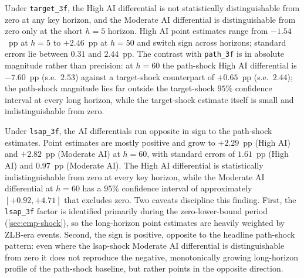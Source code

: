 \begin{table}[htbp]
\centering\small
\caption[Alternative shocks: key-horizon estimates]{Alternative shocks:
key-horizon estimates}
\label{tab:alt_shocks_key}

\end{table}

Under \texttt{target\_3f}, the High AI differential is not
statistically distinguishable from zero at any key horizon, and the
Moderate AI differential is distinguishable from zero only at the
short $h = 5$ horizon. High AI point estimates
range from $-1.54$~pp at $h = 5$ to $+2.46$~pp at $h = 50$ and switch
sign across horizons; standard errors lie between $0.31$ and
$2.44$~pp. The contrast with \texttt{path\_3f} is in absolute
magnitude rather than precision: at $h = 60$ the path-shock High AI
differential is $-7.60$~pp (s.e.~$2.53$) against a target-shock
counterpart of $+0.65$~pp (s.e.~$2.44$); the path-shock magnitude lies
far outside the target-shock $95\%$ confidence interval at every long
horizon, while the target-shock estimate itself is small and
indistinguishable from zero.

Under \texttt{lsap\_3f}, the AI differentials run opposite in sign
to the path-shock estimates. Point estimates are mostly positive
and grow to $+2.29$~pp (High AI) and $+2.82$~pp (Moderate AI) at
$h = 60$, with standard errors of $1.61$~pp (High AI) and
$0.97$~pp (Moderate AI). The High AI differential is statistically
indistinguishable from zero at every key horizon, while the
Moderate AI differential at $h = 60$ has a $95\%$ confidence
interval of approximately $[+0.92, +4.71]$ that excludes zero. Two
caveats discipline this finding. First, the \texttt{lsap\_3f}
factor is identified primarily during the zero-lower-bound period
(\cref{sec:emp-shock}), so the long-horizon point estimates are
heavily weighted by ZLB-era events. Second, the sign is positive,
opposite to the headline path-shock pattern: even where the
lsap-shock Moderate AI differential is distinguishable from zero
it does not reproduce the negative, monotonically growing
long-horizon profile of the path-shock baseline, but rather points
in the opposite direction.

